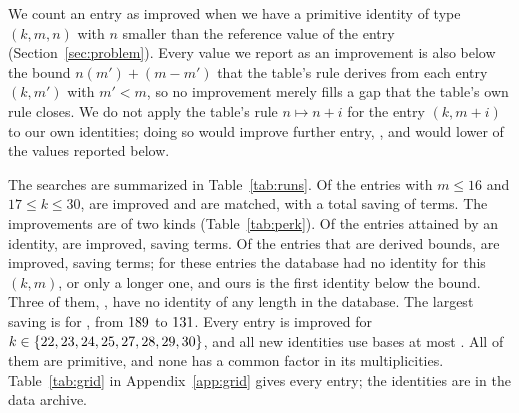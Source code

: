 \documentclass[11pt]{amsart}
\theoremstyle{definition}
\theoremstyle{remark}
\begin{document}
We count an entry as improved when we have a primitive identity of type $(k,m,n)$ with $n$
smaller than the reference value of the entry (Section~\ref{sec:problem}). Every value we report as an improvement is also below the bound $n(m')+(m-m')$
that the table's rule derives from each entry $(k,m')$ with $m'<m$, so no improvement merely
fills a gap that the table's own rule closes. We do not apply the table's rule $n\mapsto n+i$
for the entry $(k,m+i)$ to our own identities; doing so would improve \NumClosureExtra{} further entry, \ClosureExtra, and would
lower \NumClosureLower{} of the values reported below.

The searches are summarized in Table~\ref{tab:runs}. Of the \NumCells{} entries with
$m\le16$ and $17\le k\le30$, \NumImproved{} are improved and \NumTies{} are matched, with a
total saving of \TermsSaved{} terms. The improvements are of two kinds
(Table~\ref{tab:perk}). Of the \NumCellsIdent{} entries attained by an identity,
\NumImprovedIdent{} are improved, saving \TermsSavedIdent{} terms. Of the \NumCellsDerived{}
entries that are derived bounds, \NumDerived{} are improved, saving \TermsSavedDerived{} terms;
for these entries the database had no identity for this $(k,m)$, or only a longer one, and ours
is the first identity below the bound. Three of them, \NoIdentCells{}, have no identity of any length
in the database. \TiesDerivedSentence{} The largest saving is for \MaxGainCell, from $189$ to $131$.
Every entry is improved for $k\in\{22, 23, 24, 25, 27, 28, 29, 30\}$, and all new identities use bases at most
\MaxBase. All of them are primitive, and none has a common factor in its multiplicities.
Table~\ref{tab:grid} in Appendix~\ref{app:grid} gives every entry; the identities are in the
data archive.
\end{document}
